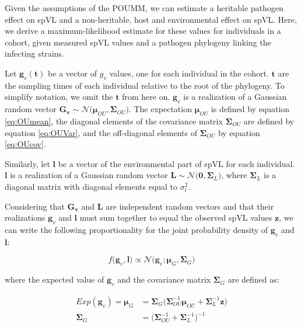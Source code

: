 \documentclass[11pt]{article}
\begin{document}
\begin{linenumbers}
Given the assumptions of the POUMM, we can estimate a heritable pathogen effect on spVL and a non-heritable, host and environmental effect on spVL. Here, we derive a maximum-likelihood estimate for these values for individuals in a cohort, given measured spVL values and a pathogen phylogeny linking the infecting strains.

Let $\bm{g}_v(\bm{t})$ be a vector of $g_v$ values, one for each individual in the cohort. $\bm{t}$ are the sampling times of each individual relative to the root of the phylogeny. To simplify notation, we omit the $\bm{t}$ from here on. $\bm{g}_v$ is a realization of a Gaussian random vector $\bm{G_v} \sim \mathcal{N}\big(\bm{\mu}_{OU}, \boldsymbol{\Sigma}_{OU}\big)$. The expectation $\bm{\mu}_{OU}$ is defined by equation \ref{eq:OUmean}, the diagonal elements of the covariance matrix $\boldsymbol{\Sigma}_{OU}$ are defined by equation \ref{eq:OUVar}, and the off-diagonal elements of $\boldsymbol{\Sigma}_{OU}$ by equation \ref{eq:OUcov}. 

Similarly, let $\bm{l}$ be a vector of the environmental part of spVL for each individual.  $\bm{l}$ is a realization of a Gaussian random vector $\bm{L} \sim \mathcal{N}\big(\bm{0}, \boldsymbol{\Sigma}_L\big)$, where $\boldsymbol{\Sigma}_L$ is a diagonal matrix with diagonal elements equal to $\sigma^2_l$.

Considering that $\bm{G_v}$ and $\bm{L}$ are independent random vectors and that their realizations $\bm{g}_v$ and $\bm{l}$ must sum together to equal the observed spVL values $\bm{z}$, we can write the following proportionality for the joint probability density of $\bm{g}_v$ and $\bm{l}$:

\begin{equation}
	f\big(\bm{g}_v, \bm{l}\big) \propto \mathcal{N}\big(\bm{g}_v; \bm{\mu}_{G}, \boldsymbol{\Sigma}_G\big)
	\label{eq:pdfGprop}
\end{equation} 

where the expected value of $\bm{g}_v$ and the covariance matrix $\boldsymbol{\Sigma}_G$ are defined as:

\begin{align}
	Exp(\bm{g}_v) = \bm{\mu}_{G} &=  \boldsymbol{\Sigma}_G\big(\boldsymbol{\Sigma}_{OU}^{-1}\bm{\mu}_{OU} + \boldsymbol{\Sigma}_L^{-1} \bm{z}\big) \label{eq:MuG}\\
	\boldsymbol{\Sigma}_G &= \big(\boldsymbol{\Sigma}_{OU}^{-1} + \boldsymbol{\Sigma}_L^{-1}\big)^{-1} \label{eq:SigmaG}
\end{align}


\end{linenumbers}
\end{document}
